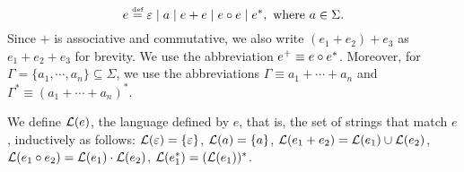 \begin{definition}
	\[e \eqdef \varepsilon \mid a \mid e + e \mid e \concat e \mid e^*, \mbox{ where } a \in \Sigma. \]
	Since $+$ is associative and commutative, we also write $(e_1 + e_2) + e_3$ as $e_1 + e_2 + e_3$ for brevity. We use the abbreviation $e^+ \equiv e \circ e^*$. Moreover, for $\Gamma = \{a_1, \cdots, a_n\}\subseteq \Sigma$, we use the abbreviations $\Gamma \equiv a_1 + \cdots + a_n$ and $\Gamma^\ast \equiv (a_1 + \cdots + a_n)^\ast$. 
\end{definition}
We define $\mathcal{L}(e)$, the language defined by $e$, that is, the set of strings that match $e$, inductively as follows: 
$\mathcal{L}(\varepsilon) =\{\varepsilon\}$,
%
$\mathcal{L}(a)= \{a\}$,
%
$\mathcal{L}(e_1 + e_2) = \mathcal{L}(e_1) \cup \mathcal{L}(e_2)$,
%
$\mathcal{L}(e_1 \circ e_2) = \mathcal{L}(e_1) \cdot \mathcal{L}(e_2)$,
%
$\mathcal{L}(e_1^*)=(\mathcal{L}(e_1))^*$.


